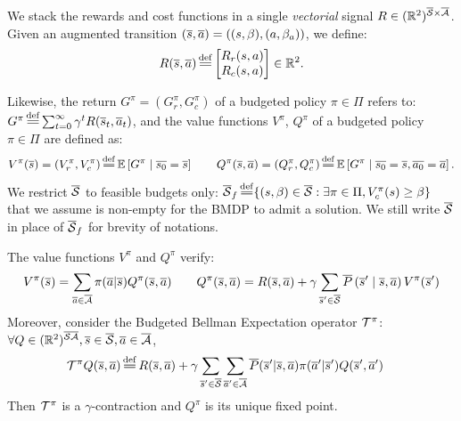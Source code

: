 \documentclass{article}
\begin{document}
We stack the rewards and cost functions in a single \emph{vectorial} signal $R \in (\mathbb{R}^2)^{{\overline{\mathcal{S}} \times \overline{\mathcal{A}}}}$.
Given an augmented transition $(\overline{s}, \overline{a}) =((s,\beta), (a, \beta_a))$, we define:
\begin{equation}
     R(\os, \oa) \eqdef  \begin{bmatrix}
     R_r(s, a)\\
     R_c(s, a)
     \end{bmatrix}\in\Real^2.
\end{equation}


Likewise, the return $G^\pi = (G_r^\pi, G_c^\pi)$ of a budgeted policy $\pi\in\Pi$ refers to:
$G^\pi \eqdef \sum_{t=0}^\infty \gamma^t R(\os_t, \oa_t)$,
and the value functions $V^\pi$, $Q^\pi$ of a budgeted policy $\pi\in\Pi$ are defined as:
\begin{equation}
    \label{eq:value-function}
V^\pi(\os) = (V_r^\pi, V_c^\pi) \eqdef \expectedvalue\left[ G^\pi \condbar \ov{s_0} = \os\right] \qquad Q^\pi(\os, \oa)= (Q_r^\pi, Q_c^\pi) \eqdef \expectedvalue\left[ G^\pi \condbar \ov{s_0} = \os, \ov{a_0} = \oa\right].
\end{equation}
We restrict $\overline{\mathcal{S}}$ to feasible budgets only: $\ocS_f \eqdef \{(s,\beta)\in\ocS: \exists \pi\in\Pi, V_c^\pi(s) \geq \beta\}$ that we assume is non-empty for the BMDP to admit a solution. We still write $\overline{\mathcal{S}}$ in place of $\overline{\mathcal{S}}_f$ for brevity of notations.

\begin{proposition}
\label{prop:bellman-expectation}
The value functions $V^\pi$ and $ Q^\pi$ verify:
\begin{align}
    V^\pi(\overline{s}) = \sum_{\overline{a}\in\overline{\mathcal{A}}}\pi(\overline{a} | \overline{s}) Q^\pi(\overline{s}, \overline{a}) \qquad Q^\pi(\overline{s}, \overline{a}) = R(\overline{s}, \overline{a}) + \gamma\sum_{\overline{s}'\in\overline{\mathcal{S}}}\overline{P}\left(\overline{s}' \;\middle|\; \overline{s}, \overline{a}\right) V^\pi(\overline{s}') \label{eq:bellman_expectation}
\end{align}
Moreover, consider the Budgeted Bellman Expectation operator $\mathcal{T}^\pi$:
$\forall Q\in(\mathbb{R}^2)^{\overline{\mathcal{S}}\overline{\mathcal{A}}}, \overline{s}\in\overline{\mathcal{S}}, \overline{a}\in\overline{\mathcal{A}}$,
\begin{align}
\label{eq:bellman_expectation_operator}
    \cT^\pi Q(\os, \oa) &\eqdef R(\os, \oa) + \gamma \sum_{\os'\in\ocS}\sum_{\oa'\in\ocA}\ov{P}(\os'|\os, \oa)\pi(\oa'|\os') Q(\os', \oa')
\end{align}
Then $\mathcal{T}^\pi$ is a $\gamma$-contraction and $Q^\pi$ is its unique fixed point.
\end{proposition}
\end{document}
